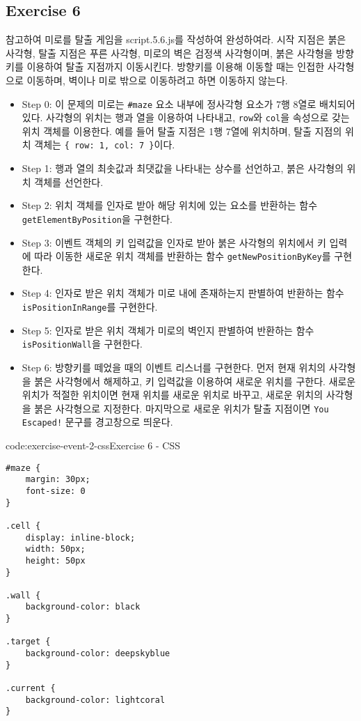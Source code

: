\subsection*{Exercise 6}

\와 \를 참고하여 미로를 탈출 게임을 script.5.6.js를 작성하여 완성하여라. 시작 지점은 붉은 사각형, 탈출 지점은 푸른 사각형, 미로의 벽은 검정색 사각형이며, 붉은 사각형을 방향키를 이용하여 탈출 지점까지 이동시킨다. 방향키를 이용해 이동할 때는 인접한 사각형으로 이동하며, 벽이나 미로 밖으로 이동하려고 하면 이동하지 않는다.

\begin{itemize}
    \item Step 0: 이 문제의 미로는 \texttt{\#maze} 요소 내부에 정사각형 요소가 7행 8열로 배치되어 있다. 사각형의 위치는 행과 열을 이용하여 나타내고, \texttt{row}와 \texttt{col}을 속성으로 갖는 위치 객체를 이용한다. 예를 들어 탈출 지점은 1행 7열에 위치하며, 탈출 지점의 위치 객체는 \texttt{\{ row: 1, col: 7 \}}이다.
    \item Step 1: 행과 열의 최솟값과 최댓값을 나타내는 상수를 선언하고, 붉은 사각형의 위치 객체를 선언한다.
    \item Step 2: 위치 객체를 인자로 받아 해당 위치에 있는 요소를 반환하는 함수 \texttt{getElementByPosition}을 구현한다.
    \item Step 3: 이벤트 객체의 키 입력값을 인자로 받아 붉은 사각형의 위치에서 키 입력에 따라 이동한 새로운 위치 객체를 반환하는 함수 \texttt{getNewPositionByKey}를 구현한다.
    \item Step 4: 인자로 받은 위치 객체가 미로 내에 존재하는지 판별하여 반환하는 함수 \texttt{isPositionInRange}를 구현한다.
    \item Step 5: 인자로 받은 위치 객체가 미로의 벽인지 판별하여 반환하는 함수 \texttt{isPositionWall}을 구현한다.
    \item Step 6: 방향키를 떼었을 때의 이벤트 리스너를 구현한다. 먼저 현재 위치의 사각형을 붉은 사각형에서 해제하고, 키 입력값을 이용하여 새로운 위치를 구한다. 새로운 위치가 적절한 위치이면 현재 위치를 새로운 위치로 바꾸고, 새로운 위치의 사각형을 붉은 사각형으로 지정한다. 마지막으로 새로운 위치가 탈출 지점이면 \texttt{You Escaped!} 문구를 경고창으로 띄운다.
\end{itemize}

\begin{codeenv}{code:exercise-event-2-css}{Exercise 6 - CSS}\begin{verbatim}
#maze {
    margin: 30px;
    font-size: 0
}

.cell {
    display: inline-block;
    width: 50px;
    height: 50px
}

.wall {
    background-color: black
}

.target {
    background-color: deepskyblue
}

.current {
    background-color: lightcoral
}
\end{verbatim}
\end{codeenv}

